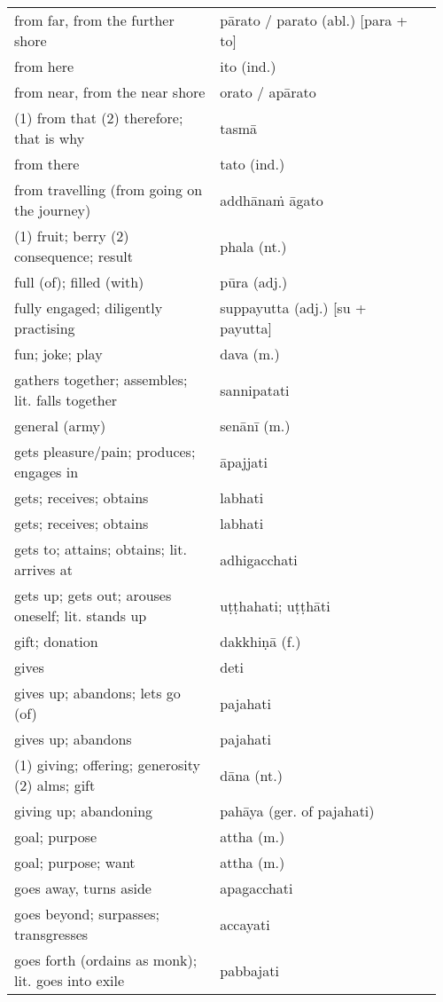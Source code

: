 \documentclass[a5paper]{memoir}
\begin{document}
\begin{longtable}{L{0.48\linewidth} L{0.48\linewidth} H}
from far, from the further shore & pārato / parato (abl.) [para + to] & \\[0pt]
from here & ito (ind.) & \\[0pt]
from near, from the near shore & orato / apārato & \\[0pt]
(1) from that (2) therefore; that is why & tasmā & \\[0pt]
from there & tato (ind.) & \\[0pt]
from travelling (from going on the journey) & addhānaṁ āgato & \\[0pt]
(1) fruit; berry (2) consequence; result & phala (nt.) & \\[0pt]
full (of); filled (with) & pūra (adj.) & \\[0pt]
fully engaged; diligently practising & suppayutta (adj.) [su + payutta] & \\[0pt]
fun; joke; play & dava (m.) & \\[0pt]
gathers together; assembles; lit. falls together & sannipatati & \\[0pt]
general (army) & senānī (m.) & \\[0pt]
gets pleasure/pain; produces; engages in & āpajjati & \\[0pt]
gets; receives; obtains & labhati & \\[0pt]
gets; receives; obtains & labhati & \\[0pt]
gets to; attains; obtains; lit. arrives at & adhigacchati & \\[0pt]
gets up; gets out; arouses oneself; lit. stands up & uṭṭhahati; uṭṭhāti & \\[0pt]
gift; donation & dakkhiṇā (f.) & \\[0pt]
gives & deti & \\[0pt]
gives up; abandons; lets go (of) & pajahati & \\[0pt]
gives up; abandons & pajahati & \\[0pt]
(1) giving; offering; generosity (2) alms; gift & dāna (nt.) & \\[0pt]
giving up; abandoning & pahāya (ger. of pajahati) & \\[0pt]
goal; purpose & attha (m.) & \\[0pt]
goal; purpose; want & attha (m.) & \\[0pt]
goes away, turns aside & apagacchati & \\[0pt]
goes beyond; surpasses; transgresses & accayati & \\[0pt]
goes forth (ordains as monk); lit. goes into exile & pabbajati & \\[0pt]

\end{longtable}
\end{document}
